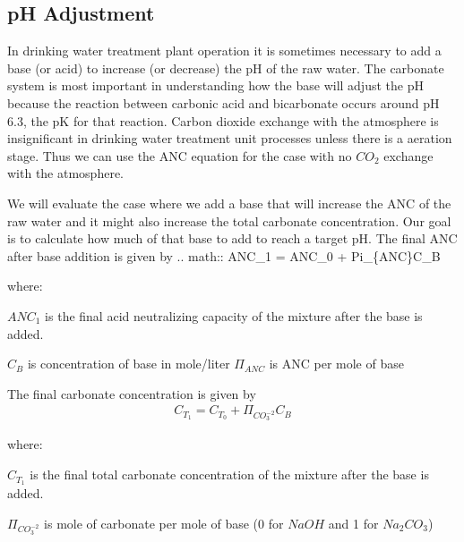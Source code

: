 \documentclass[letterpaper,10pt,english]{sphinxmanual}
\begin{document}
\subsection{pH Adjustment}
\label{\detokenize{Rapid_Mix/RM_Examples:ph-adjustment}}
In drinking water treatment plant operation it is sometimes necessary to add a base (or acid) to increase (or decrease) the pH of the raw water. The carbonate system is most important in understanding how the base will adjust the pH because the reaction between carbonic acid and bicarbonate occurs around pH 6.3, the pK for that reaction. Carbon dioxide exchange with the atmosphere is insignificant in drinking water treatment unit processes unless there is a aeration stage. Thus we can use the ANC equation for the case with no \(CO_2\) exchange with the atmosphere.

We will evaluate the case where we add a base that will increase the ANC of the raw water and it might also increase the total carbonate concentration. Our goal is to calculate how much of that base to add to reach a target pH. The final ANC after base addition is given by
.. math:: ANC\_1 = ANC\_0 + Pi\_\{ANC\}C\_B

\begin{DUlineblock}{0em}
\item[] where:
\item[] \(ANC_1\) is the final acid neutralizing capacity of the mixture after the base is added.
\item[] \(C_B\) is concentration of base in mole/liter  \(\Pi_{ANC}\) is ANC per mole of base
\end{DUlineblock}

The final carbonate concentration is given by
\begin{equation}\label{equation:Rapid_Mix/RM_Examples:Rapid_Mix/RM_Examples:17}
\begin{split}C_{T_1} ={C_{T_0}}+ \Pi_{CO_3^{-2}}C_B\end{split}
\end{equation}
\begin{DUlineblock}{0em}
\item[] where:
\item[] \(C_{T_1}\) is the final total carbonate concentration of the mixture after the base is added.
\item[] \(\Pi_{CO_3^{-2}}\) is mole of carbonate per mole of base (0 for \(NaOH\) and 1 for \(Na_2CO_3\))
\end{DUlineblock}
\end{document}

